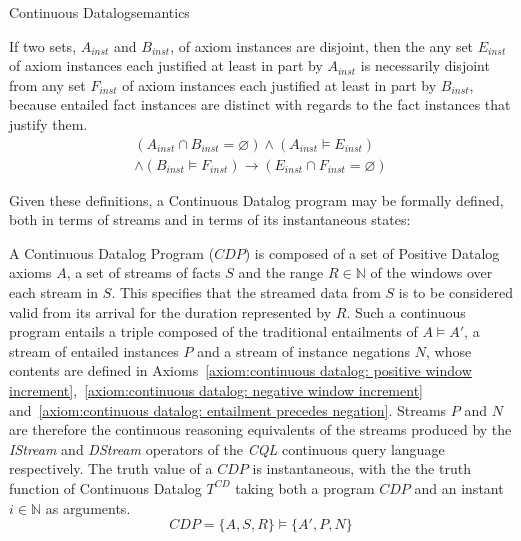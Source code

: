 \begin{nestedsection}{Continuous Datalog}{semantics}
	\begin{axiom}\label{axiom:continuous datalog: entailment disjointness}
		If two sets, $A_{inst}$ and $B_{inst}$, of axiom instances are disjoint, then the any set $E_{inst}$ of axiom instances each justified at least in part by $A_{inst}$ is necessarily disjoint from any set $F_{inst}$ of axiom instances each justified at least in part by $B_{inst}$, because entailed fact instances are distinct with regards to the fact instances that justify them.
		\begin{multline*}
			\left( A_{inst} \cap B_{inst} = \varnothing \right) \wedge \left( A_{inst} \vDash E_{inst} \right) \\
				\wedge \left( B_{inst} \vDash F_{inst} \right) \rightarrow \left( E_{inst} \cap F_{inst} = \varnothing \right)
		\end{multline*}
	\end{axiom}

	Given these definitions, a Continuous Datalog program may be formally defined, both in terms of streams and in terms of its instantaneous states:

	\begin{definition}\label{def:continuous datalog: CDP}
		A Continuous Datalog Program (${CDP}$) is composed of a set of Positive Datalog axioms $A$, a set of streams of facts $S$ and the range ${R \in \mathbb{N}}$ of the windows over each stream in $S$.
		This specifies that the streamed data from $S$ is to be considered valid from its arrival for the duration represented by $R$.
		Such a continuous program entails a triple composed of the traditional entailments of ${A \vDash A'}$, a stream of entailed instances $P$ and a stream of instance negations $N$, whose contents are defined in Axioms~\ref{axiom:continuous datalog: positive window increment},~\ref{axiom:continuous datalog: negative window increment} and~\ref{axiom:continuous datalog: entailment precedes negation}.
		Streams $P$ and $N$ are therefore the continuous reasoning equivalents of the streams produced by the \emph{IStream} and \emph{DStream} operators of the \emph{CQL} continuous query language \citep{CQL} respectively.
		The truth value of a ${CDP}$ is instantaneous, with the the truth function of Continuous Datalog $T^{CD}$ taking both a program ${CDP}$ and an instant ${i \in \mathbb{N}}$ as arguments.
		\begin{equation*}
			CDP = \{A,S,R\} \vDash \{A',P,N\}
		\end{equation*}
	\end{definition}


\end{nestedsection}
